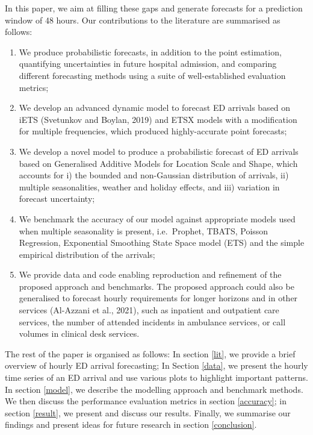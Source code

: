 \documentclass[]{elsarticle} %
\begin{document}
In this paper, we aim at filling these gaps and generate forecasts for a prediction window of 48 hours. Our contributions to the literature are summarised as follows:

\begin{enumerate}
\def\labelenumi{\arabic{enumi}.}
\item
  We produce probabilistic forecasts, in addition to the point
  estimation, quantifying uncertainties in future hospital admission,
  and comparing different forecasting methods using a suite of
  well-established evaluation metrics;
\item
  We develop an advanced dynamic model to forecast ED arrivals based
  on iETS (Svetunkov and Boylan, 2019) and ETSX models with a modification for
  multiple frequencies, which produced highly-accurate point
  forecasts;
\item
  We develop a novel model to produce a probabilistic forecast of ED
  arrivals based on Generalised Additive Models for Location Scale and
  Shape, which accounts for i) the bounded and non-Gaussian
  distribution of arrivals, ii) multiple seasonalities, weather and
  holiday effects, and iii) variation in forecast uncertainty;
\item
  We benchmark the accuracy of our model against appropriate models
  used when multiple seasonality is present, i.e.~Prophet, TBATS,
  Poisson Regression, Exponential Smoothing State Space model (ETS)
  and the simple empirical distribution of the arrivals;
\item
  We provide data and code enabling reproduction and refinement of the
  proposed approach and benchmarks. The proposed approach could also
  be generalised to forecast hourly requirements for longer horizons
  and in other services (Al-Azzani et al., 2021), such as inpatient and
  outpatient care services, the number of attended incidents in
  ambulance services, or call volumes in clinical desk services.
\end{enumerate}

The rest of the paper is organised as follows: In section \ref{lit}, we
provide a brief overview of hourly ED arrival forecasting; In Section
\ref{data}, we present the hourly time series of an ED arrival and use
various plots to highlight important patterns. In section \ref{model},
we describe the modelling approach and benchmark methods. We then
discuss the performance evaluation metrics in section \ref{accuracy};
in section \ref{result}, we present and discuss our results. Finally,
we summarise our findings and present ideas for future research in
section \ref{conclusion}.
\end{document}
